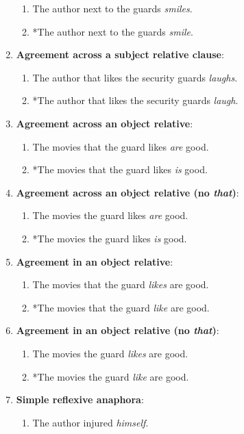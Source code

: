 \begin{enumerate}[noitemsep]
\begin{enumerate}
      \item The author next to the guards \textit{smiles}.
      \item *The author next to the guards \textit{smile}.
    \end{enumerate}
  \item \textbf{Agreement across a subject relative clause}:
    \begin{enumerate}
      \item The author that likes the security guards \textit{laughs}.
      \item *The author that likes the security guards \textit{laugh}.
    \end{enumerate}
  \item \textbf{Agreement across an object relative}:
    \begin{enumerate}
      \item The movies that the guard likes \textit{are} good.
      \item *The movies that the guard likes \textit{is} good.
    \end{enumerate}
  \item \textbf{Agreement across an object relative (no \textit{that})}:
    \begin{enumerate}
      \item The movies the guard likes \textit{are} good.
      \item *The movies the guard likes \textit{is} good.
    \end{enumerate}
  \item \textbf{Agreement in an object relative}:
    \begin{enumerate}
      \item The movies that the guard \textit{likes} are good.
      \item *The movies that the guard \textit{like} are good.
    \end{enumerate}
  \item \textbf{Agreement in an object relative (no \textit{that})}:
    \begin{enumerate}
      \item The movies the guard \textit{likes} are good.
      \item *The movies the guard \textit{like} are good.
    \end{enumerate}
  \item \textbf{Simple reflexive anaphora}:
    \begin{enumerate}
      \item The author injured \textit{himself}.

\end{enumerate}
\end{enumerate}
